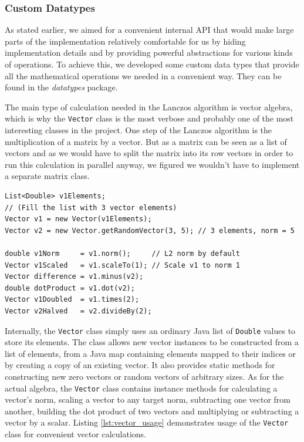 
\subsubsection{Custom Datatypes}

As stated earlier, we aimed for a convenient internal API that would make large
parts of the implementation relatively comfortable for us by hiding
implementation details and by providing powerful abstractions for various kinds
of operations. To achieve this, we developed some custom data types that
provide all the mathematical operations we needed in a convenient way. They can
be found in the \textit{datatypes} package.


The main type of calculation needed in the Lanczos algorithm is vector algebra,
which is why the \texttt{Vector} class is the most verbose and probably one of
the most interesting classes in the project. One step of the Lanczos algorithm
is the multiplication of a matrix by a vector. But as a matrix can be seen as a
list of vectors and as we would have to split the matrix into its row vectors
in order to run this calculation in parallel anyway, we figured we wouldn't
have to implement a separate matrix class.

\begin{lstlisting}[label=lst:vector_usage,captionpos=b,caption=Example use of
the \texttt{Vector} class]
List<Double> v1Elements;
// (Fill the list with 3 vector elements)
Vector v1 = new Vector(v1Elements);
Vector v2 = new Vector.getRandomVector(3, 5); // 3 elements, norm = 5

double v1Norm     = v1.norm();     // L2 norm by default
Vector v1Scaled   = v1.scaleTo(1); // Scale v1 to norm 1
Vector difference = v1.minus(v2);
double dotProduct = v1.dot(v2);
Vector v1Doubled  = v1.times(2);
Vector v2Halved   = v2.divideBy(2);
\end{lstlisting}

Internally, the \texttt{Vector} class simply uses an ordinary Java list of
\texttt{Double} values to store its elements. The class allows new vector
instances to be constructed from a list of elements, from a Java map containing
elements mapped to their indices or by creating a copy of an existing vector.
It also provides static methods for constructing new zero vectors or random
vectors of arbitrary sizes. As for the actual algebra, the \texttt{Vector}
class contains instance methods for calculating a vector's norm, scaling a
vector to any target norm, subtracting one vector from another, building the
dot product of two vectors and multiplying or subtracting a vector by a scalar.
Listing \ref{lst:vector_usage} demonstrates usage of the \texttt{Vector} class
for convenient vector calculations.

